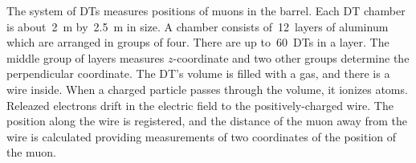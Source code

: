 The system of DTs measures positions of muons in the barrel. Each DT chamber is about~2~m by~2.5~m in size. A chamber consists of~12~layers of aluminum which are arranged in groups of four. There are up to~60~DTs in a layer. The middle group of layers measures $z$-coordinate and two other groups determine the perpendicular coordinate. The DT's volume is filled with a gas, and there is a wire inside. When a charged particle passes through the volume, it ionizes atoms. Releazed electrons drift in the electric field to the positively-charged wire. The position along the wire is registered, and the distance of the muon away from the wire is calculated providing measurements of two coordinates of the position of the muon.


